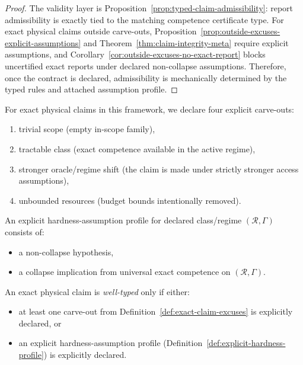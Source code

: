 \begin{proof}
The validity layer is Proposition~\ref{prop:typed-claim-admissibility}: report admissibility is exactly tied to the matching competence certificate type.
For exact physical claims outside carve-outs, Proposition~\ref{prop:outside-excuses-explicit-assumptions} and Theorem~\ref{thm:claim-integrity-meta} require explicit assumptions, and Corollary~\ref{cor:outside-excuses-no-exact-report} blocks uncertified exact reports under declared non-collapse assumptions.
Therefore, once the contract is declared, admissibility is mechanically determined by the typed rules and attached assumption profile.
\end{proof}

\begin{definition}\label{def:exact-claim-excuses}
For exact physical claims in this framework, we declare four explicit carve-outs:
\begin{enumerate}
\item trivial scope (empty in-scope family),
\item tractable class (exact competence available in the active regime),
\item stronger oracle/regime shift (the claim is made under strictly stronger access assumptions),
\item unbounded resources (budget bounds intentionally removed).
\end{enumerate}
\end{definition}

\begin{definition}\label{def:explicit-hardness-profile}
An explicit hardness-assumption profile for declared class/regime $(\mathcal{R},\Gamma)$ consists of:
\begin{itemize}
\item a non-collapse hypothesis,
\item a collapse implication from universal exact competence on $(\mathcal{R},\Gamma)$.
\end{itemize}
\end{definition}

\begin{definition}\label{def:exact-claim-welltyped}
An exact physical claim is \emph{well-typed} only if either:
\begin{itemize}
\item at least one carve-out from Definition~\ref{def:exact-claim-excuses} is explicitly declared, or
\item an explicit hardness-assumption profile (Definition~\ref{def:explicit-hardness-profile}) is explicitly declared.
\end{itemize}
\end{definition}

